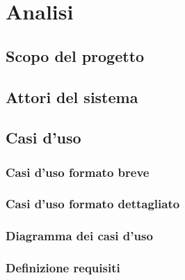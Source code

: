 \chapter{Analisi}
\label{chap:analisi}


\section{Scopo del progetto}
\section{Attori del sistema}

\section{Casi d'uso}
\subsection{Casi d'uso formato breve}
\subsection{Casi d'uso formato dettagliato}
\subsection{Diagramma dei casi d'uso}
\subsection{Definizione requisiti}

